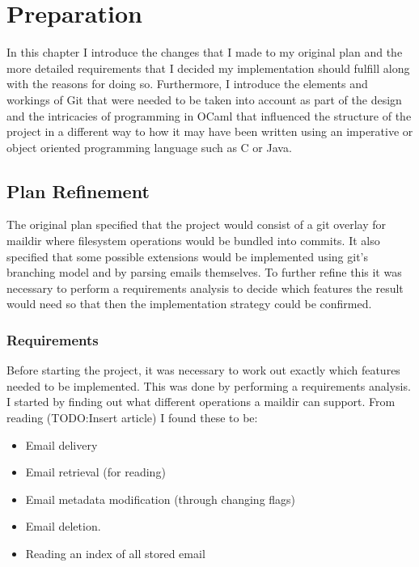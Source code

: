 \chapter{Preparation}

In this chapter I introduce the changes that I made to my original plan and the more detailed requirements that I decided my implementation should fulfill along with the reasons for doing so. Furthermore, I introduce the elements and workings of Git that were needed to be taken into account as part of the design and the intricacies of programming in OCaml that influenced the structure of the project in a different way to how it may have been written using an imperative or object oriented programming language such as C or Java.

\section{Plan Refinement}

The original plan specified that the project would consist of a git overlay for maildir where filesystem operations would be bundled into commits. It also specified that some possible extensions would be implemented using git's branching model and by parsing emails themselves. To further refine this it was necessary to perform a requirements analysis to decide which features the result would need so that then the implementation strategy could be confirmed.

\subsection{Requirements}

Before starting the project, it was necessary to work out exactly which features needed to be implemented. This was done by performing a requirements analysis. I started by finding out what different operations a maildir can support. From reading (TODO:Insert article)\cite{TODO} I found these to be:

\begin{itemize}
  \item Email delivery
  \item Email retrieval (for reading)
  \item Email metadata modification (through changing flags)
  \item Email deletion.
  \item Reading an index of all stored email
\end{itemize}

